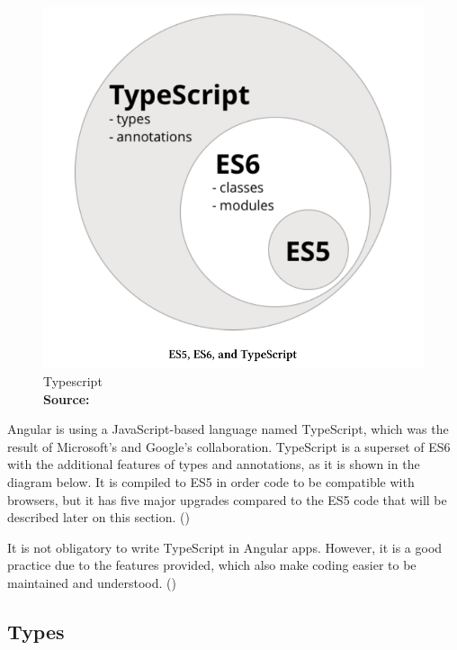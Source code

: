 \begin{figure}
	\begin{center}
		\includegraphics[scale=0.25]{images/Typescript.png}
	\end{center}
	\caption{
		Typescript
		\\
		\textbf{Source:} \cite{angularUpandRunning}
	}
\end{figure}

Angular is using a JavaScript-based language named TypeScript, which was the result of Microsoft's and Google's collaboration. TypeScript is a superset of ES6 with the additional features of types and annotations, as it is shown in the diagram below. It is compiled to ES5 in order code to be compatible with browsers, but it has five major upgrades compared to the ES5 code that will be described later on this section. (\cite{murray2018ng}) \par

It is not obligatory to write TypeScript in Angular apps. However, it is a good practice due to the features provided, which also make coding easier to be maintained and understood. (\cite{angularUpandRunning}) \par

\subsection{Types}

